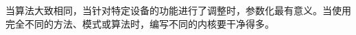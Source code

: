 \begin{tcolorbox}[colback=red!5!white,colframe=red!75!black]
当算法大致相同，当针对特定设备的功能进行了调整时，参数化最有意义。当使用完全不同的方法、模式或算法时，编写不同的内核要干净得多。
\end{tcolorbox}



























































